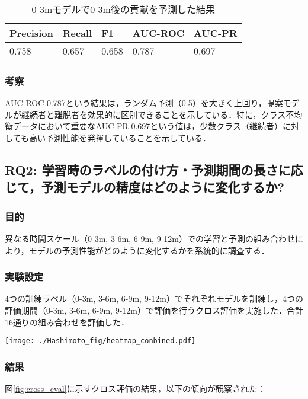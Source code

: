 \begin{table}[h]
    \centering
    \caption{0-3mモデルで0-3m後の貢献を予測した結果}
    \begin{tabularx}{\columnwidth}{XXXXX}
       \hline
       Precision & Recall & F1 & AUC-ROC & AUC-PR \\
       \hline
       0.758  & 0.657 & 0.658 & 0.787 & 0.697\\
       \hline
    \end{tabularx}
    \label{table:rq1_result}
\end{table}

\subsubsection{考察}
AUC-ROC 0.787という結果は，ランダム予測（0.5）を大きく上回り，提案モデルが継続者と離脱者を効果的に区別できることを示している．特に，クラス不均衡データにおいて重要なAUC-PR 0.697という値は，少数クラス（継続者）に対しても高い予測性能を発揮していることを示している．

\subsection{RQ2: 学習時のラベルの付け方・予測期間の長さに応じて，予測モデルの精度はどのように変化するか?}

\subsubsection{目的}
異なる時間スケール（0-3m, 3-6m, 6-9m, 9-12m）での学習と予測の組み合わせにより，モデルの予測性能がどのように変化するかを系統的に調査する．

\subsubsection{実験設定}
4つの訓練ラベル（0-3m, 3-6m, 6-9m, 9-12m）でそれぞれモデルを訓練し，4つの評価期間（0-3m, 3-6m, 6-9m, 9-12m）で評価を行うクロス評価を実施した．合計16通りの組み合わせを評価した．

\begin{figure*}[t]
    \centering
    \texttt{[image: ./Hashimoto\_fig/heatmap\_conbined.pdf]}
    \caption{各モデルのクロス評価（左：AUC-ROC，右：AUC-PR）}
    \label{fig:cross_eval}
\end{figure*}

\subsubsection{結果}
図\ref{fig:cross_eval}に示すクロス評価の結果，以下の傾向が観察された：

